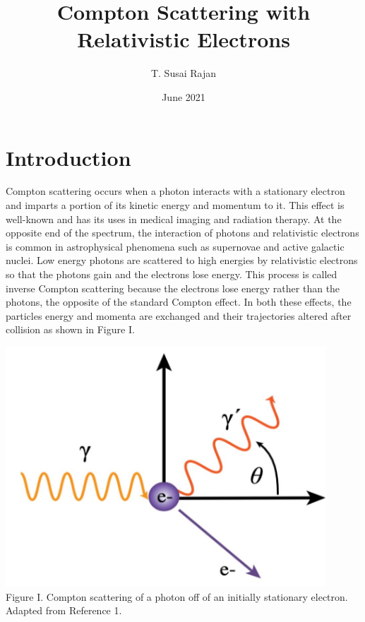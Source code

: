 \documentclass{article}
\title{Compton Scattering with Relativistic Electrons}
\author{T. Susai Rajan}
\date{June 2021}
\begin{document}
\maketitle

\tableofcontents


\section{Introduction}

Compton scattering occurs when a photon interacts with a stationary electron and imparts a portion of its kinetic energy and momentum to it. This effect is well-known and has its uses in medical imaging and radiation therapy. At the opposite end of the spectrum, the interaction of photons and relativistic electrons is common in astrophysical phenomena such as supernovae and active galactic nuclei. Low energy photons are scattered to high energies by relativistic electrons so that the photons gain and the electrons lose energy. This process is called inverse Compton scattering because the electrons lose energy rather than the photons, the opposite of the standard Compton effect. In both these effects, the particles energy and momenta are exchanged and their trajectories altered after collision as shown in Figure I.

\begin{center}
\includegraphics[width=12cm, height=9cm]{Compton_scattering.jpg} \\

Figure I. Compton scattering of a photon off of an initially stationary electron. Adapted from Reference 1.
\end{center}
\end{document}
